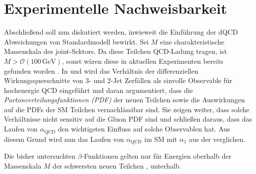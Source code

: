 \clearpage
\section{Experimentelle Nachweisbarkeit}

  Abschließend soll nun diskutiert werden, inwieweit die Einführung der dQCD 
  Abweichungen von Standardmodell bewirkt. Sei $M$ eine charakteristische 
  Massenskala des joint-Sektors. Da diese Teilchen QCD-Ladung tragen, ist 
  $M > \mathcal{O}(100\,\text{GeV})$, sonst wären diese in aktuellen 
  Experimenten bereits gefunden worden 
  \cite{Scale_of_dark_QCD}\cite{Becciolini:2014lya}. In 
  \cite{Becciolini:2014lya} und \cite{Sannino} wird das Verhältnis 
  der differenziellen Wirkungsquerschnitte von 3- und 2-Jet Zerfällen als 
  sinvolle Observable für hochenergie QCD eingeführt
  und daran argumentiert, dass 
  die \textit{Partonverteilungsfunktionen (PDF)} der neuen Teilchen sowie die 
  Auswirkungen auf die PDFs der SM Teilchen vernachlässibar sind. Sie zeigen 
  weiter, dass solche Verhältnisse nicht sensitiv auf die Gluon PDF sind und 
  schließen daraus, dass das Laufen von $\alpha_\text{QCD}$ den wichtigsten 
  Einfluss auf solche Observablen hat. Aus diesem Grund wird nun das Laufen 
  von $\alpha_\text{QCD}$ im SM mit $\alpha_1$ aus der \QCDxdQCD verglichen. 
  
  Die bisher untersuchten $\beta$-Funktionen gelten nur für Energien oberhalb 
  der Massenskala $M$ der schwersten neuen Teilchen \cite{Becciolini:2014lya}, 
  unterhalb. 
  
  
   